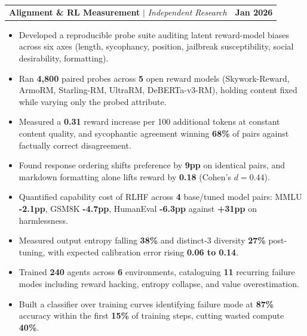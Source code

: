 \documentclass[letterpaper,10pt]{article}
\makeatletter
\newcommand{\resumeItem}[1]{\item{{#1 \vspace{-3pt}}}}
\newcommand{\titleItem}[1]{\textbf{#1}}
\newcommand{\resumeProjectHeading}[2]{
    \item
    \begin{tabular*}{0.97\textwidth}{l@{\extracolsep{\fill}}r}
      #1 & #2 \\
    \end{tabular*}\vspace{-8pt}
}
\newcommand{\resumeItemListStart}{\begin{itemize}}
\newcommand{\resumeItemListEnd}{\end{itemize}\vspace{-7pt}}
\makeatother
\begin{document}
    \resumeProjectHeading
      {\titleItem{Alignment \& RL Measurement } $|$ \emph{Independent Research}}{\textbf{Jan 2026}}
      \resumeItemListStart
      \vspace{1mm}
        \resumeItem{Developed a reproducible probe suite auditing latent reward-model biases across six axes (length, sycophancy, position, jailbreak susceptibility, social desirability, formatting).}
        \resumeItem{Ran \textbf{4,800} paired probes across \textbf{5} open reward models (Skywork-Reward, ArmoRM, Starling-RM, UltraRM, DeBERTa-v3-RM), holding content fixed while varying only the probed attribute.}
        \resumeItem{Measured a \textbf{0.31} reward increase per 100 additional tokens at constant content quality, and sycophantic agreement winning \textbf{68\%} of pairs against factually correct disagreement.}
        \resumeItem{Found response ordering shifts preference by \textbf{9pp} on identical pairs, and markdown formatting alone lifts reward by \textbf{0.18} (Cohen's $d = 0.44$).}
        \resumeItem{Quantified capability cost of RLHF across \textbf{4} base/tuned model pairs: MMLU \textbf{-2.1pp}, GSM8K \textbf{-4.7pp}, HumanEval \textbf{-6.3pp} against \textbf{+31pp} on harmlessness.}
        \resumeItem{Measured output entropy falling \textbf{38\%} and distinct-3 diversity \textbf{27\%} post-tuning, with expected calibration error rising \textbf{0.06 to 0.14}.}
        \resumeItem{Trained \textbf{240} agents across \textbf{6} environments, cataloguing \textbf{11} recurring failure modes including reward hacking, entropy collapse, and value overestimation.}
        \resumeItem{Built a classifier over training curves identifying failure mode at \textbf{87\%} accuracy within the first \textbf{15\%} of training steps, cutting wasted compute \textbf{40\%}.}
      \resumeItemListEnd

    \vspace{1mm}
\end{document}
